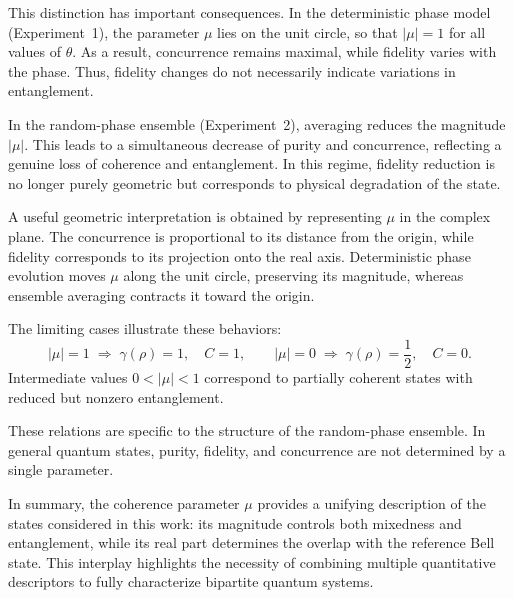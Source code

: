 \documentclass[a4paper]{article}
\begin{document}
\medskip

This distinction has important consequences. In the deterministic phase model (Experiment~1), the parameter \( \mu \) lies on the unit circle, so that \( |\mu| = 1 \) for all values of \( \theta \). As a result, concurrence remains maximal, while fidelity varies with the phase. Thus, fidelity changes do not necessarily indicate variations in entanglement.

\medskip

In the random-phase ensemble (Experiment~2), averaging reduces the magnitude \( |\mu| \). This leads to a simultaneous decrease of purity and concurrence, reflecting a genuine loss of coherence and entanglement. In this regime, fidelity reduction is no longer purely geometric but corresponds to physical degradation of the state.

\medskip

A useful geometric interpretation is obtained by representing \( \mu \) in the complex plane. The concurrence is proportional to its distance from the origin, while fidelity corresponds to its projection onto the real axis. Deterministic phase evolution moves \( \mu \) along the unit circle, preserving its magnitude, whereas ensemble averaging contracts it toward the origin.

\medskip

The limiting cases illustrate these behaviors:
\[
|\mu| = 1 \;\Rightarrow\; \gamma(\rho)=1, \quad C=1,
\qquad
|\mu| = 0 \;\Rightarrow\; \gamma(\rho)=\frac{1}{2}, \quad C=0.
\]
Intermediate values \( 0 < |\mu| < 1 \) correspond to partially coherent states with reduced but nonzero entanglement.

\medskip

These relations are specific to the structure of the random-phase ensemble. In general quantum states, purity, fidelity, and concurrence are not determined by a single parameter.

\medskip

In summary, the coherence parameter \( \mu \) provides a unifying description of the states considered in this work: its magnitude controls both mixedness and entanglement, while its real part determines the overlap with the reference Bell state. This interplay highlights the necessity of combining multiple quantitative descriptors to fully characterize bipartite quantum systems.


\end{document}
